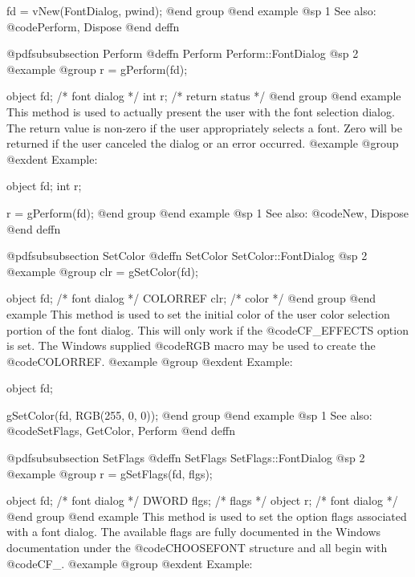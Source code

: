 fd = vNew(FontDialog, pwind);
@end group
@end example
@sp 1
See also:  @code{Perform, Dispose}
@end deffn









@pdfsubsubsection {Perform}
@deffn {Perform} Perform::FontDialog
@sp 2
@example
@group
r = gPerform(fd);

object  fd;     /*  font dialog    */
int     r;      /*  return status  */
@end group
@end example
This method is used to actually present the user with the font
selection dialog.  The return value is non-zero if the user appropriately
selects a font.  Zero will be returned if the user canceled the dialog
or an error occurred.
@example
@group
@exdent Example:

object  fd;
int     r;

r = gPerform(fd);
@end group
@end example
@sp 1
See also:  @code{New, Dispose}
@end deffn









@pdfsubsubsection {SetColor}
@deffn {SetColor} SetColor::FontDialog
@sp 2
@example
@group
clr = gSetColor(fd);

object   fd;    /*  font dialog  */
COLORREF clr;   /*  color        */
@end group
@end example
This method is used to set the initial color of the user color selection
portion of the font dialog.  This will only work if the
@code{CF_EFFECTS} option is set.  The Windows supplied @code{RGB} macro
may be used to create the @code{COLORREF}.
@example
@group
@exdent Example:

object  fd;

gSetColor(fd, RGB(255, 0, 0));
@end group
@end example
@sp 1
See also:  @code{SetFlags, GetColor, Perform}
@end deffn











@pdfsubsubsection {SetFlags}
@deffn {SetFlags} SetFlags::FontDialog
@sp 2
@example
@group
r = gSetFlags(fd, flgs);

object  fd;     /*  font dialog  */
DWORD   flgs;   /*  flags        */
object  r;      /*  font dialog  */
@end group
@end example
This method is used to set the option flags associated with a font dialog.
The available flags are fully documented in the Windows documentation
under the @code{CHOOSEFONT} structure and all begin with @code{CF_}.
@example
@group
@exdent Example:

